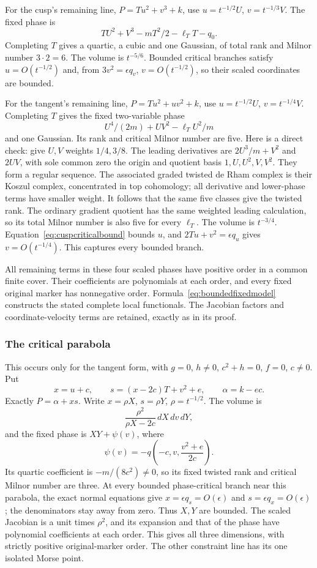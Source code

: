 \documentclass[11pt]{article}
\theoremstyle{definition}\newtheorem{definition}[theorem]{Definition}
\theoremstyle{remark}\newtheorem{remark}[theorem]{Remark}
\begin{document}
For the cusp's remaining line, $P=T u^2+v^3+k$, use
$u=t^{-1/2}U$, $v=t^{-1/3}V$. The fixed phase is
\[
 TU^2+V^3-mT^2/2-\ell_TT-q_0.
\]
Completing $T$ gives a quartic, a cubic and one Gaussian, of
total rank and Milnor number $3\cdot2=6$. The volume is
$t^{-5/6}$. Bounded critical branches satisfy $u=O(t^{-1/2})$
and, from $3v^2=\epsilon q_v$, $v=O(t^{-1/2})$, so their
scaled coordinates are bounded.

For the tangent's remaining line, $P=T u^2+uv^2+k$, use
$u=t^{-1/2}U$, $v=t^{-1/4}V$. Completing $T$ gives the fixed
two-variable phase
\[
 U^4/(2m)+UV^2-\ell_TU^2/m
\]
and one Gaussian. Its rank and critical Milnor number are five.
Here is a direct check: give $U,V$ weights $1/4,3/8$. The
leading derivatives are $2U^3/m+V^2$ and $2UV$, with sole
common zero the origin and quotient basis
$1,U,U^2,V,V^2$. They form a regular sequence. The associated
graded twisted de Rham complex is their Koszul complex,
concentrated in top cohomology; all derivative and lower-phase
terms have smaller weight. It follows that the same five
classes give the twisted rank. The ordinary gradient quotient
has the same weighted leading calculation, so its total
Milnor number is also five for every $\ell_T$. The volume is
$t^{-3/4}$. Equation~\eqref{eq:cuspcriticalbound} bounds $u$,
and $2Tu+v^2=\epsilon q_u$ gives $v=O(t^{-1/4})$. This
captures every bounded branch.

All remaining terms in these four scaled phases have positive
order in a common finite cover. Their coefficients are
polynomials at each order, and every fixed original marker has
nonnegative order. Formula~\eqref{eq:boundedfixedmodel} constructs
the stated complete local functionals. The Jacobian factors and
coordinate-velocity terms are retained, exactly as in its proof.

\subsubsection*{The critical parabola}

This occurs only for the tangent form, with $g=0$, $h\ne0$,
$c^2+h=0$, $f=0$, $c\ne0$. Put
\[
 x=u+c,\qquad s=(x-2c)T+v^2+e,\qquad\alpha=k-ec.
\]
Exactly $P=\alpha+xs$. Write $x=\rho X$, $s=\rho Y$,
$\rho=t^{-1/2}$. The volume is
\[
 \frac{\rho^2}{\rho X-2c}\,dX\,dv\,dY,
\]
and the fixed phase is $XY+\psi(v)$, where
\[
 \psi(v)=-q\!\left(-c,v,\frac{v^2+e}{2c}\right).
\]
Its quartic coefficient is $-m/(8c^2)\ne0$, so its fixed
twisted rank and critical Milnor number are three. At every
bounded phase-critical branch near this parabola, the exact
normal equations give $x=\epsilon q_s=O(\epsilon)$ and
$s=\epsilon q_x=O(\epsilon)$; the denominators stay away
from zero. Thus $X,Y$ are bounded. The scaled Jacobian is a
unit times $\rho^2$, and its expansion and that of the phase
have polynomial coefficients at each order. This gives all
three dimensions, with strictly positive original-marker order.
The other constraint line has its one isolated Morse point.
\end{document}
